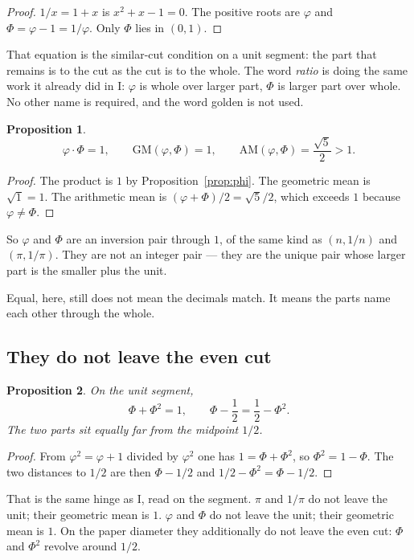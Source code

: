 \documentclass[10pt,a4paper]{article}
\theoremstyle{plain}
\newtheorem{proposition}{Proposition}
\theoremstyle{definition}
\theoremstyle{remark}
\begin{document}
\begin{proof}
$1/x=1+x$ is $x^{2}+x-1=0$.
The positive roots are $\varphi$ and $\Phi=\varphi-1=1/\varphi$.
Only $\Phi$ lies in $(0,1)$.
\end{proof}

That equation is the similar-cut condition on a unit segment: the part that remains is to the cut as the cut is to the whole.
The word \emph{ratio} is doing the same work it already did in I: $\varphi$ is whole over larger part, $\Phi$ is larger part over whole.
No other name is required, and the word golden is not used.

\begin{proposition}
\label{prop:phi-gm}
\[
\varphi\cdot\Phi=1,\qquad
\mathrm{GM}(\varphi,\Phi)=1,\qquad
\mathrm{AM}(\varphi,\Phi)=\frac{\sqrt5}{2}>1.
\]
\end{proposition}

\begin{proof}
The product is $1$ by Proposition~\ref{prop:phi}.
The geometric mean is $\sqrt{1}=1$.
The arithmetic mean is $(\varphi+\Phi)/2=\sqrt5/2$, which exceeds $1$ because $\varphi\neq\Phi$.
\end{proof}

So $\varphi$ and $\Phi$ are an inversion pair through $1$, of the same kind as $(n,1/n)$ and $(\pi,1/\pi)$.
They are not an integer pair --- they are the unique pair whose larger part is the smaller plus the unit.

Equal, here, still does not mean the decimals match.
It means the parts name each other through the whole.

\subsection{They do not leave the even cut}

\begin{proposition}
\label{prop:midline}
On the unit segment,
\[
\Phi+\Phi^{2}=1,\qquad
\Phi-\frac12=\frac12-\Phi^{2}.
\]
The two parts sit equally far from the midpoint $1/2$.
\end{proposition}

\begin{proof}
From $\varphi^{2}=\varphi+1$ divided by $\varphi^{2}$ one has $1=\Phi+\Phi^{2}$, so $\Phi^{2}=1-\Phi$.
The two distances to $1/2$ are then $\Phi-1/2$ and $1/2-\Phi^{2}=\Phi-1/2$.
\end{proof}

That is the same hinge as I, read on the segment.
$\pi$ and $1/\pi$ do not leave the unit; their geometric mean is $1$.
$\varphi$ and $\Phi$ do not leave the unit; their geometric mean is $1$.
On the paper diameter they additionally do not leave the even cut: $\Phi$ and $\Phi^{2}$ revolve around $1/2$.
\end{document}
